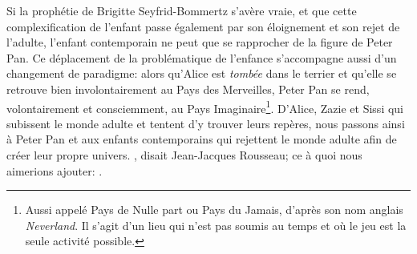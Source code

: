 Si la prophétie de Brigitte Seyfrid-Bommertz s'avère vraie, et que cette complexification de l'enfant passe également par son éloignement et son rejet de l'adulte, l'enfant contemporain ne peut que se rapprocher de la figure de Peter Pan.
Ce déplacement de la problématique de l'enfance s'accompagne aussi d'un changement de paradigme: alors qu'Alice est \textit{tombée} dans le terrier et qu'elle se retrouve bien involontairement au Pays des Merveilles, Peter Pan se rend, volontairement et consciemment, au Pays Imaginaire\footnote{Aussi appelé Pays de Nulle part ou Pays du Jamais, d'après son nom anglais \textit{Neverland}. Il s'agit d'un lieu qui n'est pas soumis au temps et où le jeu est la seule activité possible.}.
D'Alice, Zazie et Sissi qui subissent le monde adulte et tentent d'y trouver leurs repères, nous passons ainsi à Peter Pan et aux enfants contemporains qui rejettent le monde adulte afin de créer leur propre univers. , disait Jean-Jacques Rousseau; ce à quoi nous aimerions ajouter: .
